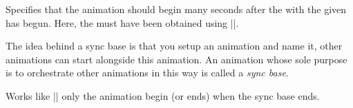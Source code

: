 \begin{command}{\pgfsys@animation@syncbegin{}}
  Specifies that the animation should begin  many
  seconds after the  with the given  has
  begun. Here, the  must have been obtained using
  |\pgfsys@new@id|.

  The idea behind a sync base is that you setup an animation and name
  it, other animations can start alongside this animation. An
  animation whose sole purpose is to orchestrate other animations in
  this way is called a \emph{sync base}. 
\end{command}

\begin{command}{\pgfsys@animation@syncend{}}
  Works like |\pgfsys@animation@syncbegin| only the animation begin
  (or ends) when the sync base ends.
\end{command}


